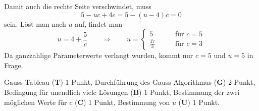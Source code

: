 \begin{loesung}
Damit auch die rechte Seite verschwindet, muss
\[
5-uc+4c=5-(u-4)c=0
\]
sein.
Löst man nach $u$ auf, findet man
\[
u=4+\frac{5}{c}
\qquad\Rightarrow\qquad
u=\begin{cases}
5&\qquad\text{für $c=5$}\\
\frac{17}{3}&\qquad\text{für $c=3$}
\end{cases}
\]
Da ganzzahlige Parameterwerte verlangt wurden, kommt nur $c=5$ und $u=5$
in Frage.
\end{loesung}

\begin{bewertung}
Gauss-Tableau ({\bf T}) 1 Punkt,
Durchführung des Gauss-Algorithmus ({\bf G}) 2 Punkt,
Bedingung für unendlich viele Lösungen ({\bf B}) 1 Punkt,
Bestimmung der zwei möglichen Werte für $c$ ({\bf C}) 1 Punkt,
Bestimmung von $u$ ({\bf U}) 1 Punkt.
\end{bewertung}


